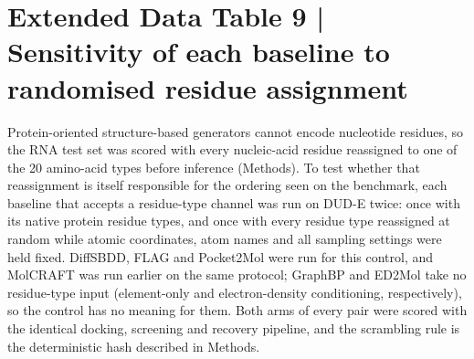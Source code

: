 \section*{Extended Data Table 9 | Sensitivity of each baseline to randomised residue assignment}

Protein-oriented structure-based generators cannot encode nucleotide residues, so the RNA test set was scored with every nucleic-acid residue reassigned to one of the 20 amino-acid types before inference (Methods). To test whether that reassignment is itself responsible for the ordering seen on the benchmark, each baseline that accepts a residue-type channel was run on DUD-E twice: once with its native protein residue types, and once with every residue type reassigned at random while atomic coordinates, atom names and all sampling settings were held fixed. DiffSBDD, FLAG and Pocket2Mol were run for this control, and MolCRAFT was run earlier on the same protocol; GraphBP and ED2Mol take no residue-type input (element-only and electron-density conditioning, respectively), so the control has no meaning for them. Both arms of every pair were scored with the identical docking, screening and recovery pipeline, and the scrambling rule is the deterministic hash described in Methods.

